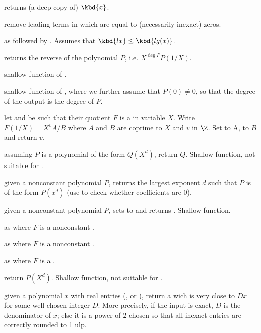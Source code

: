  returns (a deep copy of) $\kbd{x}$.

 remove leading terms in  which are
equal to (necessarily inexact) zeros.

 as 
followed by . Assumes that $\kbd{lx} \leq
\kbd{lg(x)}$.

 returns the reverse of the polynomial
$P$, i.e. $X^{\deg P} P(1/X)$.

 shallow function of .

 shallow function of ,
where we further assume that $P(0)\neq 0$, so that the degree of the output
is the degree of $P$.

 let  and  be such that
their quotient $F$ is a  in variable $X$. Write $F(1/X) = X^v A/B$
where $A$ and $B$ are coprime to $X$ and $v$ in $\Z$. Set  to A,
 to $B$ and return $v$.

 assuming $P$ is a polynomial of the
form $Q(X^d)$, return $Q$. Shallow function, not suitable for
.

 given a nonconstant polynomial
$P$, returns the largest exponent $d$ such that $P$ is of the form $P(x^d)$
(use  to check whether coefficients are 0).

 given a nonconstant polynomial
$P$, sets  to  and
returns . Shallow function.

as  where $F$ is a nonconstant .

as  where $F$ is a nonconstant .

as  where $F$ is a .

 return $P(X^d)$. Shallow function, not
suitable for .

 given a polynomial $x$ with real entries
(,  or ), return a  wich is very close
to $D x$ for some well-chosen integer $D$. More precisely, if the input is
exact, $D$ is the denominator of $x$; else it is a power of $2$ chosen
so that all inexact entries are correctly rounded to 1 ulp.

